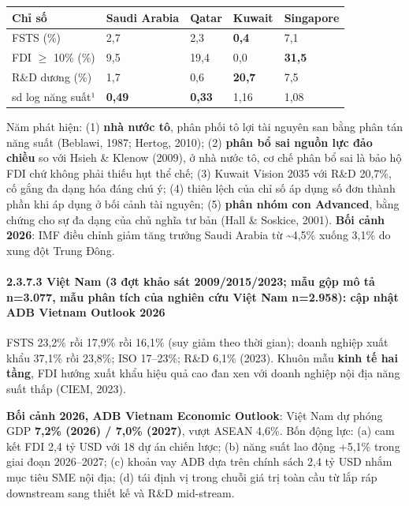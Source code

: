 \documentclass[
  a4paper,
  13pt]{extreport}
\begin{document}
\begin{longtable}[]{@{}lllll@{}}
\toprule\noalign{}
Chỉ số & Saudi Arabia & Qatar & Kuwait & Singapore \\
\midrule\noalign{}
\endhead
\bottomrule\noalign{}
\endlastfoot
FSTS (\%) & 2,7 & 2,3 & \textbf{0,4} & 7,1 \\
FDI \(\geq\) 10\% (\%) & 9,5 & 19,4 & 0,0 & \textbf{31,5} \\
R\&D dương (\%) & 1,7 & 0,6 & \textbf{20,7} & 7,5 \\
sd log năng suất¹ & \textbf{0,49} & \textbf{0,33} & 1,16 & 1,08 \\
\end{longtable}

Năm phát hiện: (1) \textbf{nhà nước tô}, phân phối tô lợi tài nguyên san
bằng phân tán năng suất (Beblawi, 1987; Hertog, 2010); (2) \textbf{phân
bổ sai nguồn lực đảo chiều} so với Hsieh \& Klenow (2009), ở nhà nước
tô, cơ chế phân bổ sai là bảo hộ FDI chứ không phải thiếu hụt thể chế;
(3) Kuwait Vision 2035 với R\&D 20,7\%, cố gắng đa dạng hóa đáng chú ý;
(4) thiên lệch của chỉ số áp dụng số đơn thành phần khi áp dụng ở bối
cảnh tài nguyên; (5) \textbf{phân nhóm con Advanced}, bằng chứng cho sự
đa dạng của chủ nghĩa tư bản (Hall \& Soskice, 2001). \textbf{Bối cảnh
2026}: IMF điều chỉnh giảm tăng trưởng Saudi Arabia từ
\textasciitilde4,5\% xuống 3,1\% do xung đột Trung Đông.

\hypertarget{viux1ec7t-nam-3-ux111ux1ee3t-khux1ea3o-suxe1t-200920152023-mux1eabu-gux1ed9p-muxf4-tux1ea3-n3.077-mux1eabu-phuxe2n-tuxedch-cux1ee7a-nghiuxean-cux1ee9u-viux1ec7t-nam-n2.958-cux1eadp-nhux1eadt-adb-vietnam-outlook-2026}{%
\paragraph{2.3.7.3 Việt Nam (3 đợt khảo sát 2009/2015/2023; mẫu gộp mô
tả n=3.077, mẫu phân tích của nghiên cứu Việt Nam n=2.958): cập nhật ADB
Vietnam Outlook
2026}\label{viux1ec7t-nam-3-ux111ux1ee3t-khux1ea3o-suxe1t-200920152023-mux1eabu-gux1ed9p-muxf4-tux1ea3-n3.077-mux1eabu-phuxe2n-tuxedch-cux1ee7a-nghiuxean-cux1ee9u-viux1ec7t-nam-n2.958-cux1eadp-nhux1eadt-adb-vietnam-outlook-2026}}

FSTS 23,2\% rồi 17,9\% rồi 16,1\% (suy giảm theo thời gian); doanh
nghiệp xuất khẩu 37,1\% rồi 23,8\%; ISO 17--23\%; R\&D 6,1\% (2023).
Khuôn mẫu \textbf{kinh tế hai tầng}, FDI hướng xuất khẩu hiệu quả cao
đan xen với doanh nghiệp nội địa năng suất thấp (CIEM, 2023).

\textbf{Bối cảnh 2026, ADB Vietnam Economic Outlook}: Việt Nam dự phóng
GDP \textbf{7,2\% (2026) / 7,0\% (2027)}, vượt ASEAN 4,6\%. Bốn động
lực: (a) cam kết FDI 2,4 tỷ USD với 18 dự án chiến lược; (b) năng suất
lao động +5,1\% trong giai đoạn 2026--2027; (c) khoản vay ADB dựa trên
chính sách 2,4 tỷ USD nhắm mục tiêu SME nội địa; (d) tái định vị trong
chuỗi giá trị toàn cầu từ lắp ráp downstream sang thiết kế và R\&D
mid-stream.
\end{document}
